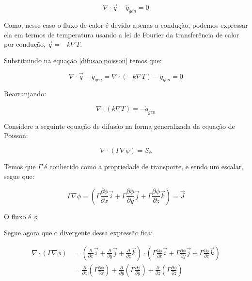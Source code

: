 \begin{equation}
    \nabla \cdot \vec{q} - \dot{q}_{gen} = 0
    \label{difusao:poisson}
\end{equation}

Como, nesse caso o fluxo de calor é devido apenas a condução, podemos expressar ela em termos de temperatura usando a lei de Fourier da transferência de calor por condução, $\vec{q} = -k \nabla T$.

Substituindo na equação \ref{difusao:poisson} temos que:

\begin{equation}
    \nabla \cdot \vec{q} - \dot{q}_{gen} = \nabla \cdot (-k \nabla T) - \dot{q}_{gen} = 0
\end{equation}

Rearranjando:

\begin{equation}
    \nabla \cdot (k \nabla T) = -\dot{q}_{gen}
\end{equation}

Considere a seguinte equação de difusão na forma generalizada da equação de Poisson:

\begin{equation}
    \nabla \cdot (\Gamma \nabla \phi) = S_\phi
\end{equation}

Temos que $\Gamma$ é conhecido como a propriedade de transporte, e sendo um escalar, segue que:

\begin{equation}
    \Gamma \nabla \phi = \left( \Gamma \frac{\partial \phi}{\partial x} \vec{i} + \Gamma \frac{\partial \phi}{\partial y} \vec{j} + \Gamma \frac{\partial \phi}{\partial z} \vec{k} \right) = \vec{J}
\end{equation}

O fluxo é $\phi$

Segue agora que o divergente dessa expressão fica:

\begin{equation}
\begin{split}
    \nabla \cdot (\Gamma \nabla \phi) &= \left( \frac{\partial}{\partial x}\vec{i} + \frac{\partial}{\partial y}\vec{j} + \frac{\partial}{\partial z}\vec{k} \right) \cdot \left( \Gamma \frac{\partial \phi}{\partial x}\vec{i} + \Gamma \frac{\partial \phi}{\partial y}\vec{j} + \Gamma \frac{\partial \phi}{\partial z}\vec{k} \right)\\
    &= \frac{\partial}{\partial x} \left( \Gamma \frac{\partial \phi}{\partial x} \right) + \frac{\partial}{\partial y} \left( \Gamma \frac{\partial \phi}{\partial y} \right) + \frac{\partial}{\partial z} \left( \Gamma \frac{\partial \phi}{\partial z} \right)
\end{split}
\end{equation}

